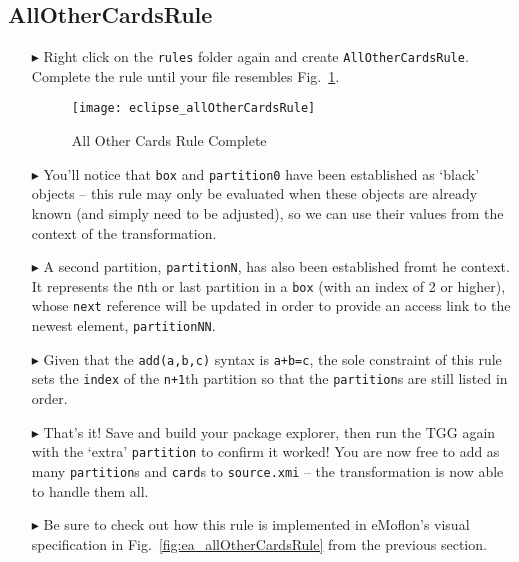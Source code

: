\newpage
\hypertarget{allCards tex}{}
\subsection{AllOtherCardsRule}
\texHeader

\begin{itemize}

\item[$\blacktriangleright$] Right click on the \texttt{rules} folder again and create \texttt{AllOtherCardsRule}. Complete the rule until your file resembles
Fig.~\ref{fig:eclipse_allOtherCardsRule}.

\vspace{0.5cm}

\begin{figure}[htbp]
\begin{center}
  \texttt{[image: eclipse\_allOtherCardsRule]}
  \caption{All Other Cards Rule Complete}
  \label{fig:eclipse_allOtherCardsRule}
\end{center}
\end{figure}

\item[$\blacktriangleright$] You'll notice that \texttt{box} and \texttt{partition0} have been established as `black' objects -- this rule may only be evaluated
when these objects are already known (and simply need to be adjusted), so we can use their values from the context of the transformation.

\vspace{0.5cm}

\item[$\blacktriangleright$] A second partition, \texttt{partitionN}, has also been established fromt he context. It represents the \texttt{n}th or last
partition in a \texttt{box} (with an index of 2 or higher), whose \texttt{next} reference will be updated in order to provide an access
link to the newest element, \texttt{partitionNN}.

\newpage

\item[$\blacktriangleright$] Given that the \texttt{add(a,b,c)} syntax is \texttt{a+b=c}, the sole constraint of this rule sets the \texttt{index} of the
\texttt{n+1}th partition so that the \texttt{partition}s are still listed in order.

\vspace{0.5cm}

\item[$\blacktriangleright$] That's it! Save and build your package explorer, then run the TGG again with the `extra' \texttt{partition} to confirm it worked!
You are now free to add as many \texttt{partition}s and \texttt{card}s to \texttt{source.xmi} -- the transformation is now able to handle them all.

\vspace{0.5cm}

\item[$\blacktriangleright$] Be sure to check out how this rule is implemented in eMoflon's visual specification in Fig.~\ref{fig:ea_allOtherCardsRule} from the
previous section.

\end{itemize}

